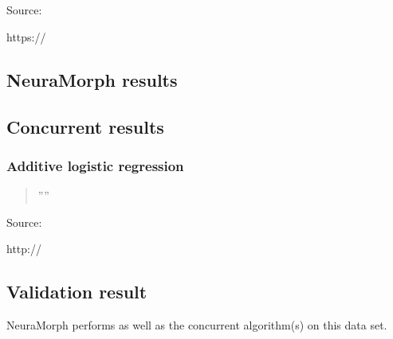 \documentclass[8pt, a4paper]{article}
\begin{document}
\section{}

Source: 

https://

\subsection{NeuraMorph results}

%

\subsection{Concurrent results}

\subsubsection{Additive logistic regression}

\begin{quote}
''''
\end{quote}

Source:

http://

\subsection{Validation result}

NeuraMorph performs as well as the concurrent algorithm(s) on this data set.
\end{document}
